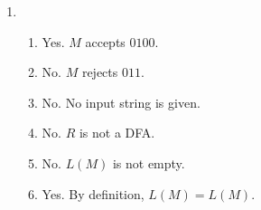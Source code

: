 \documentclass[11pt]{article}
\begin{document}
\begin{enumerate}[4.1]
  \item
  \begin{enumerate}
    \item Yes. $M$ accepts $0100$.
    \item No. $M$ rejects $011$.
    \item No. No input string is given.
    \item No. $R$ is not a DFA.
    \item No. $L(M)$ is not empty.
    \item Yes. By definition, $L(M) = L(M)$.
  \end{enumerate}
\end{enumerate}
\end{document}
